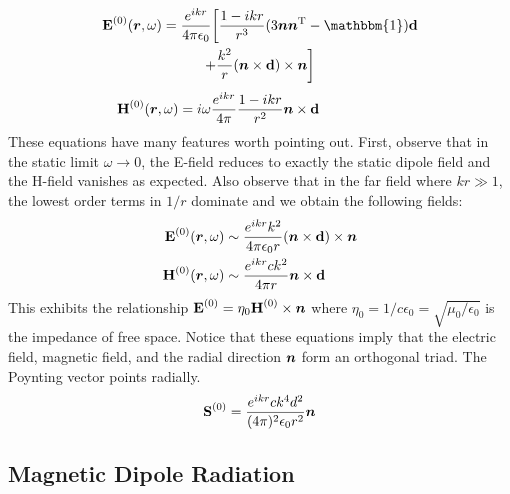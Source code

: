 \documentclass[twocolumn]{gwclass}
\newcommand{\bt}[1]{\text{\textbf{#1}}}
\begin{document}
	\begin{multline*} 
	\bt{E}^{(0)}(\*r,\omega) = \frac{e^{ikr}}{4\pi\epsilon_0}\bigg[\frac{1-ikr}{r^3}(3\*n\*n^\t{T} - \mathbbm{1})\bt{d}\\ + \frac{k^2}{r}(\*n\times\bt{d})\times\*n \bigg] 
	\end{multline*}
	$$ \bt{H}^{(0)}(\*r,\omega) = i\omega\frac{e^{ikr}}{4\pi }\frac{1-ikr}{r^2}\*n\times\bt{d} \qquad\qquad\quad\quad $$
	These equations have many features worth pointing out. First, observe that in the static limit $\omega\to 0$, the E-field reduces to exactly the static dipole field and the H-field vanishes as expected. Also observe that in the far field where $kr\gg 1$, the lowest order terms in $1/r$ dominate and we obtain the following fields:
	\begin{align*}
		\bt{E}^{(0)}(\*r, \omega) &\sim \frac{e^{ikr}k^2}{4\pi\epsilon_0 r} (\*n\times\bt{d})\times\*n \\
		\bt{H}^{(0)}(\*r,\omega) &\sim \frac{e^{ikr}ck^2}{4\pi r} \*n\times\bt{d}
	\end{align*}
	This exhibits the relationship $\bt{E}^{(0)} = \eta_0 \bt{H}^{(0)}\times \*n$ where $\eta_0=1/c\epsilon_0=\sqrt{\mu_0/\epsilon_0}$ is the impedance of free space. Notice that these equations imply that the electric field, magnetic field, and the radial direction $\boldsymbol{n}$ form an orthogonal triad. The Poynting vector points radially.
	$$ \bt{S}^{(0)} = \frac{e^{ikr}ck^4d^2}{(4\pi)^2\epsilon_0r^2}\*n $$
	
	\subsection{Magnetic Dipole Radiation}
	
\end{document}
